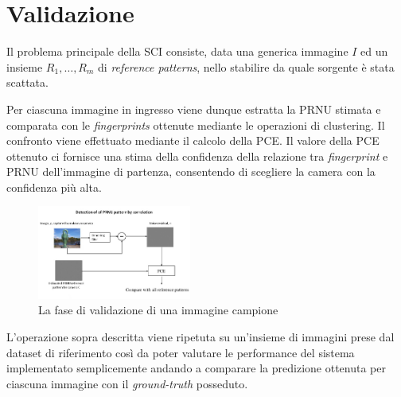 \section{Validazione}

Il problema principale della SCI consiste, data una generica immagine $I$ ed un insieme $R_1, \ldots, R_m$ di \emph{reference patterns}, nello stabilire da quale sorgente è stata scattata.

Per ciascuna immagine in ingresso viene dunque estratta la PRNU stimata e comparata con le \emph{fingerprints} ottenute mediante le operazioni di clustering. Il confronto viene effettuato mediante il calcolo della PCE. Il valore della PCE ottenuto ci fornisce una stima della confidenza della relazione tra \emph{fingerprint} e PRNU dell'immagine di partenza, consentendo di scegliere la camera con la confidenza più alta.

\begin{figure}[h]
\begin{center}
\includegraphics[width=0.45\textwidth]{images/validation.jpg}
\end{center}
  \caption{La fase di validazione di una immagine campione}
\label{fig:validation}
\end{figure}

L'operazione sopra descritta viene ripetuta su un'insieme di immagini prese dal dataset di riferimento così da poter valutare le performance del sistema implementato semplicemente andando a comparare la predizione ottenuta per ciascuna immagine con il \emph{ground-truth} posseduto.